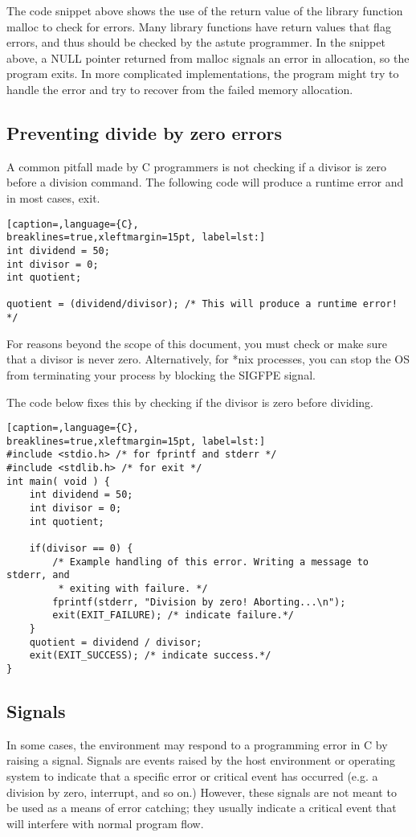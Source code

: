 The code snippet above shows the use of the return value of the library
function malloc to check for errors. Many library functions have return values
that flag errors, and thus should be checked by the astute programmer. In the
snippet above, a NULL pointer returned from malloc signals an error in
allocation, so the program exits. In more complicated implementations, the
program might try to handle the error and try to recover from the failed memory
allocation.

\subsection{Preventing divide by zero errors}
A common pitfall made by C programmers is not checking if a divisor is zero
before a division command. The following code will produce a runtime error and
in most cases, exit.
\lstset{basicstyle=\scriptsize, numbers=left, captionpos=b, tabsize=4}
\begin{lstlisting}[caption=,language={C},
breaklines=true,xleftmargin=15pt, label=lst:]
int dividend = 50;
int divisor = 0;
int quotient;

quotient = (dividend/divisor); /* This will produce a runtime error! */
\end{lstlisting}

For reasons beyond the scope of this document, you must check or make sure that
a divisor is never zero. Alternatively, for *nix processes, you can stop the OS
from terminating your process by blocking the SIGFPE signal. 

The code below fixes this by checking if the divisor is zero before dividing.
\lstset{basicstyle=\scriptsize, numbers=left, captionpos=b, tabsize=4}
\begin{lstlisting}[caption=,language={C},
breaklines=true,xleftmargin=15pt, label=lst:]
#include <stdio.h> /* for fprintf and stderr */
#include <stdlib.h> /* for exit */
int main( void ) {
	int dividend = 50;
	int divisor = 0;
	int quotient;
	
	if(divisor == 0) {
		/* Example handling of this error. Writing a message to stderr, and
		 * exiting with failure. */
		fprintf(stderr, "Division by zero! Aborting...\n");
		exit(EXIT_FAILURE); /* indicate failure.*/
	}
	quotient = dividend / divisor;
	exit(EXIT_SUCCESS); /* indicate success.*/
}
\end{lstlisting}

\subsection{Signals}
In some cases, the environment may respond to a programming error in C by
raising a signal. Signals are events raised by the host environment or
operating system to indicate that a specific error or critical event has
occurred (e.g. a division by zero, interrupt, and so on.) However, these
signals are not meant to be used as a means of error catching; they usually
indicate a critical event that will interfere with normal program flow. 

